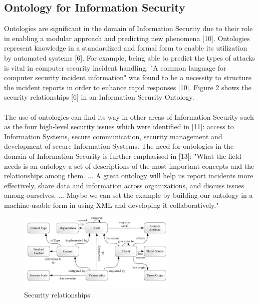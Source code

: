 \documentclass[conference, compsoc]{IEEEtran}
\begin{document}
\subsection{Ontology for Information Security}
Ontologies are significant in the domain of Information Security due to their role in enabling a modular approach and predicting new phenomena [10]. Ontologies represent knowledge in a standardized and formal form to enable its utilization by automated systems [6]. For example, being able to predict the types of attacks is vital in computer security incident handling. "A common language for computer security incident information" was found to be a necessity to structure the incident reports in order to enhance rapid responses [10]. Figure 2 shows the  security relationships [6] in an Information Security Ontology.
\\
\\
The use of ontologies can find its way in other areas of Information Security such as the four high-level security issues which were identified in [11]: access to Information Systems, secure communication, security management and development of secure Information Systems. The need for ontologies in the domain of Information Security is further emphasised in [13]: "What the field needs is an ontology-a set of descriptions of the most important concepts and the relationships among them. ... A great ontology will help us report incidents more effectively, share data and information across organizations, and discuss issues among ourselves. ... Maybe we can set the example by building our ontology in a machine-usable form in using XML and developing it collaboratively."

\begin{figure}[!t]
\centering
\includegraphics[width=3.0in]{sec-relationships}
\caption{Security relationships}
\label{sec-relationships}
\end{figure}
\end{document}
